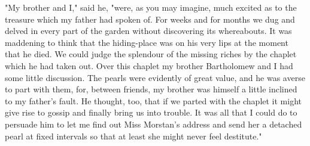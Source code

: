 \documentclass[a4paper,oneside,12pt]{amsart}
\begin{document}
{ 
"My brother and I," said he, "were, as you may imagine, much excited as to the treasure which my father had spoken of. For weeks and for months we dug and delved in every part of the garden without discovering its whereabouts. It was maddening to think that the hiding-place was on his very lips at the moment that he died. We could judge the splendour of the missing riches by the chaplet which he had taken out. Over this chaplet my brother Bartholomew and I had some little discussion. The pearls were evidently of great value, and he was averse to part with them, for, between friends, my brother was himself a little inclined to my father's fault. He thought, too, that if we parted with the chaplet it might give rise to gossip and finally bring us into trouble. It was all that I could do to persuade him to let me find out Miss Morstan's address and send her a detached pearl at fixed intervals so that at least she might never feel destitute."
\\ } 
\end{document}
